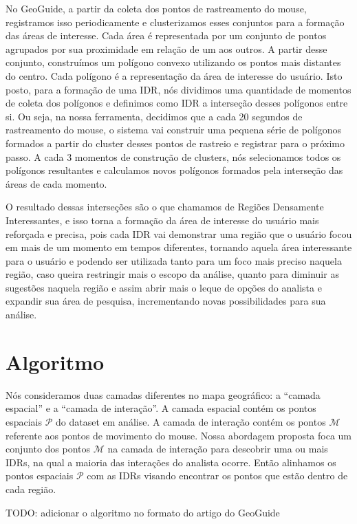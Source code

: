 No GeoGuide, a partir da coleta dos pontos de rastreamento do mouse, registramos isso periodicamente e clusterizamos esses conjuntos para a formação das áreas de interesse. Cada área é representada por um conjunto de pontos agrupados por sua proximidade em relação de um aos outros. A partir desse conjunto, construímos um polígono convexo utilizando os pontos mais distantes do centro. Cada polígono é a representação da área de interesse do usuário. Isto posto, para a formação de uma IDR, nós dividimos uma quantidade de momentos de coleta dos polígonos e definimos como IDR a interseção desses polígonos entre si. Ou seja, na nossa ferramenta, decidimos que a cada 20 segundos de rastreamento do mouse, o sistema vai construir uma pequena série de polígonos formados a partir do cluster desses pontos de rastreio e registrar para o próximo passo. A cada 3 momentos de construção de clusters, nós selecionamos todos os polígonos resultantes e calculamos novos polígonos formados pela interseção das áreas de cada momento.

O resultado dessas interseções são o que chamamos de Regiões Densamente Interessantes, e isso torna a formação da área de interesse do usuário mais reforçada e precisa, pois cada IDR vai demonstrar uma região que o usuário focou em mais de um momento em tempos diferentes, tornando aquela área interessante para o usuário e podendo ser utilizada tanto para um foco mais preciso naquela região, caso queira restringir mais o escopo da análise, quanto para diminuir as sugestões naquela região e assim abrir mais o leque de opções do analista e expandir sua área de pesquisa, incrementando novas possibilidades para sua análise.

\section{Algoritmo}

Nós consideramos duas camadas diferentes no mapa geográfico: a ``camada espacial'' e a ``camada de interação''. A camada espacial contém os pontos espaciais $\mathcal{P}$ do dataset em análise. A camada de interação  contém os pontos $\mathcal{M}$ referente aos pontos de movimento do mouse. Nossa abordagem proposta foca um conjunto dos pontos $\mathcal{M}$ na camada de interação para descobrir uma ou mais IDRs, na qual a maioria das interações do analista ocorre. Então alinhamos os pontos espaciais $\mathcal{P}$ com as IDRs visando encontrar os pontos que estão dentro de cada região. 

TODO: adicionar o algoritmo no formato do artigo do GeoGuide

